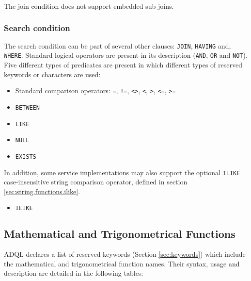 \documentclass[11pt,a4paper]{ivoa}
\begin{document}
The join condition does not support embedded sub joins.

\subsubsection{Search condition}
\label{sec:search}

The search condition can be part of several other clauses: \verb:JOIN:, \verb:HAVING: and,
\verb:WHERE:. Standard logical operators are present in its description
(\verb:AND:, \verb:OR: and \verb:NOT:). Five different types of predicates are present in which
different types of reserved keywords or characters are used:

\begin{itemize}
    \item Standard comparison operators: \verb:=:, \verb:!=:, \verb:<>:, \verb:<:, \verb:>:, \verb:<=:, \verb:>=:
    \item \verb:BETWEEN:
    \item \verb:LIKE:
    \item \verb:NULL:
    \item \verb:EXISTS:
\end{itemize}

In addition, some service implementations may also support the optional
\verb:ILIKE: case-insensitive string comparison operator, defined in section \ref{sec:string.functions.ilike}.

\begin{itemize}
    \item \verb:ILIKE:
\end{itemize}

\clearpage
\subsection{Mathematical and Trigonometrical Functions}
\label{sec:math.functions}

ADQL declares a list of reserved keywords (Section \ref{sec:keywords}) which include
the mathematical and trigonometrical function names. Their syntax,
usage and description are detailed in the following tables:
\end{document}

